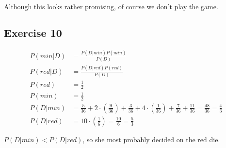 Although this looks rather promising, of course we don't play the game.


\subsection*{Exercise 10}

\begin{align*}
P(min|D) &= \frac{P(D|min)P(min)}{P(D)}\\
P(red|D) &= \frac{P(D|red)P(red)}{P(D)}\\
P(red)   &= \frac{1}{2}  \\
P(min)   &= \frac{1}{2}  \\
P(D|min) &= \frac{5}{36} 
      + 2 \cdot \left(\frac{9}{36}\right)
      + \frac{3}{36}
      + 4 \cdot \left( \frac{1}{36} \right)
      + \frac{7}{36}
      + \frac{11}{36}
      = \frac{48}{36} = \frac{4}{3} \\
P(D|red) &= 10 \cdot \left(\frac{1}{6}\right) = \frac{10}{6} = \frac{5}{3}
\end{align*}

$P(D|min) < P(D|red)$, so she most probably decided on the red die.
